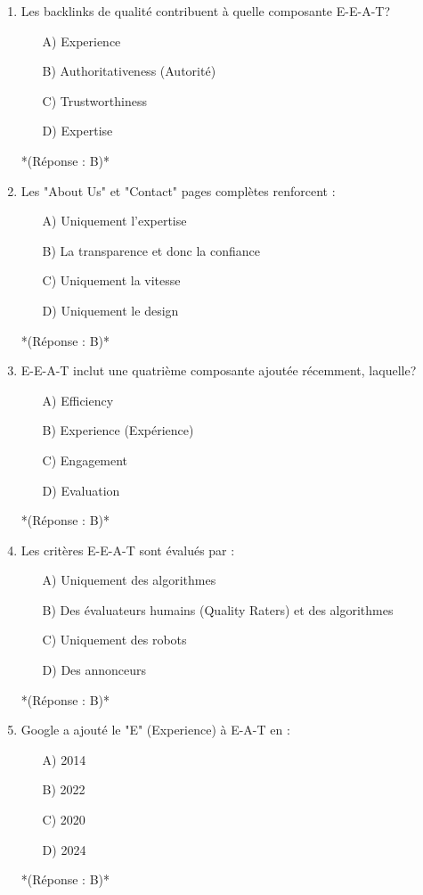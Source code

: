 \documentclass[12pt,a4paper,twoside]{report}
\begin{document}
\begin{enumerate}
\item Les backlinks de qualité contribuent à quelle composante E-E-A-T?
\begin{itemize}
\item[A)] Experience
\item[B)] Authoritativeness (Autorité)
\item[C)] Trustworthiness
\item[D)] Expertise
\end{itemize}
*(Réponse : B)*

\item Les "About Us" et "Contact" pages complètes renforcent :
\begin{itemize}
\item[A)] Uniquement l'expertise
\item[B)] La transparence et donc la confiance
\item[C)] Uniquement la vitesse
\item[D)] Uniquement le design
\end{itemize}
*(Réponse : B)*

\item E-E-A-T inclut une quatrième composante ajoutée récemment, laquelle?
\begin{itemize}
\item[A)] Efficiency
\item[B)] Experience (Expérience)
\item[C)] Engagement
\item[D)] Evaluation
\end{itemize}
*(Réponse : B)*

\item Les critères E-E-A-T sont évalués par :
\begin{itemize}
\item[A)] Uniquement des algorithmes
\item[B)] Des évaluateurs humains (Quality Raters) et des algorithmes
\item[C)] Uniquement des robots
\item[D)] Des annonceurs
\end{itemize}
*(Réponse : B)*

\item Google a ajouté le "E" (Experience) à E-A-T en :
\begin{itemize}
\item[A)] 2014
\item[B)] 2022
\item[C)] 2020
\item[D)] 2024
\end{itemize}
*(Réponse : B)*


\end{enumerate}
\end{document}
